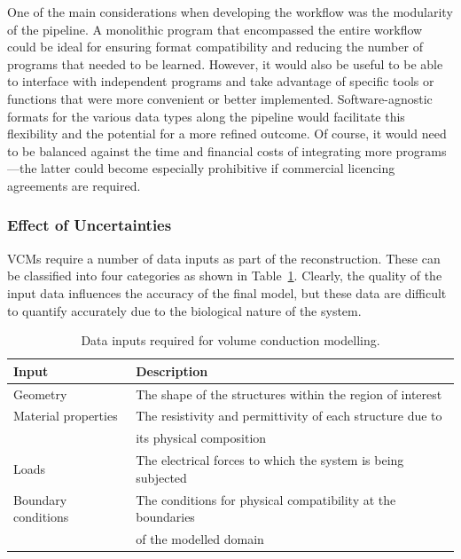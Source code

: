 One of the main considerations when developing the workflow was the modularity
of the pipeline. A monolithic program that encompassed the entire workflow could
be ideal for ensuring format compatibility and reducing the number of programs
that needed to be learned. However, it would also be useful to be able to
interface with independent programs and take advantage of specific tools or
functions that were more convenient or better implemented. Software-agnostic
formats for the various data types along the pipeline would facilitate this
flexibility and the potential for a more refined outcome. Of course, it would
need to be balanced against the time and financial costs of integrating more
programs---the latter could become especially prohibitive if commercial
licencing agreements are required.

\subsubsection{Effect of Uncertainties}

VCMs require a number of data inputs as part of the \insilico{} reconstruction.
These can be classified into four categories as shown in
Table~\ref{table:model_inputs}. Clearly, the quality of the input data
influences the accuracy of the final model, but these data are difficult to quantify
accurately due to the biological nature of the system.

\begin{table}
	\centering
	\sffamily
	\small
	
	\caption[Data inputs required for volume conduction modelling]{Data inputs
	required for volume conduction modelling.}
	\label{table:model_inputs}
	
    \begin{tabular}{l l}
	\toprule
	\textbf{Input}			& \textbf{Description} \\
	\midrule
	
	Geometry				& The shape of the structures within the region of interest \\
	Material properties		& The resistivity and permittivity of each structure due to \\
							& \tableindent its physical composition \\
	Loads					& The electrical forces to which the system is being subjected \\
	Boundary conditions		& The conditions for physical compatibility at the boundaries \\ 
							& \tableindent of the modelled domain \\
	\bottomrule
	\end{tabular}
		
\end{table}

